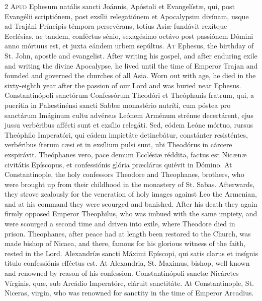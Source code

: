 \begin{paracol}{2}
\lettrine[lines=2]{A}{pud} Ephesum natális sancti Joánnis, Apóstoli et Evangelístæ, 
 qui, post Evangélii scriptiónem, post exsílii relegatiónem et Apocalypsim 
 divínam, usque ad Trajáni Príncipis témpora persevérans, totíus Asiæ 
 fundávit rexítque Ecclésias, ac tandem, conféctus sénio, sexagésimo octávo 
 post passiónem Dómini anno mórtuus est, et juxta eándem urbem sepúltus.
\switchcolumn
{}
\lettrine[lines=2]{A}{t} Ephesus, the birthday of St. John, apostle and evangelist. After 
 writing his gospel, and after enduring exile and writing the divine 
 Apocalypse, he lived until the time of Emperor Trajan and founded and 
 governed the churches of all Asia. Worn out with age, he died in the 
 sixty-eighth year after the passion of our Lord and was buried near Ephesus.
\switchcolumn*
{}
Constantinópoli sanctórum Confessórum Theodóri et Theóphanis fratrum, qui, a 
 puerítia in Palæstinénsi sancti Sabbæ 
 monastério nutríti, cum póstea pro sanctárum Imáginum cultu advérsus Leónem 
 Arménum strénue decertárent, ejus jussu verbéribus affécti sunt et exsílio 
 relegáti. Sed, eódem Leóne mórtuo, rursus Theóphilo Imperatóri, qui 
 eádem impietáte detinebátur, constánter resisténtes, verbéribus íterum cæsi 
 et in exsílium pulsi sunt, ubi Theodórus in cárcere exspirávit. 
 Theóphanes vero, pace demum Ecclésiæ réddita, factus est Nicænæ civitátis 
 Epíscopus, et confessiónis glória præclárus quiévit in Dómino.
\switchcolumn
{}
At Constantinople, the holy confessors Theodore and Theophanes, brothers, 
 who were brought up from their childhood in the monastery of St. Sabas. 
 Afterwards, they strove zealously for the veneration of holy images against 
 Leo the Armenian, and at his command they were scourged and banished. 
 After his death they again firmly opposed Emperor Theophilus, who was imbued 
 with the same impiety, and were scourged a second time and driven into exile, where Theodore died in prison. Theophanes, after peace had at 
 length been restored to the Church, was made bishop of Nicaea, and there, 
 famous for his glorious witness of the faith, rested in the Lord.
\switchcolumn*
{}
Alexandríæ sancti Máximi Epíscopi, qui satis 
 clarus et insígnis título confessiónis efféctus est.
\switchcolumn
{}
At Alexandria, St. Maximus, bishop, well known and renowned by reason of his 
 confession.
\switchcolumn*
{}
Constantinópoli sanctæ Nicáretes Vírginis, quæ, 
 sub Arcádio Imperatóre, cláruit sanctitáte.
\switchcolumn
{}
At Constantinople, St. Niceras, virgin, who was renowned for sanctity in the 
 time of Emperor Arcadius.
\switchcolumn*
{}
\end{paracol}


